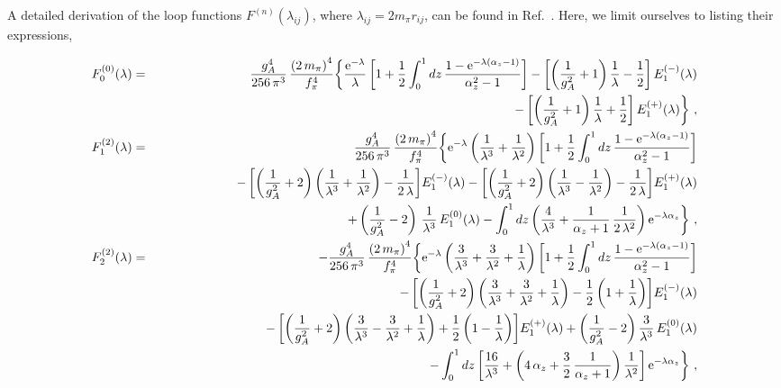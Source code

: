 \documentclass[aps,prc,floatfix,showpacs,twocolumn, preprintnumbers]{revtex4-2}
\begin{document}
A detailed derivation of the loop functions $F^{(n)}(\lambda_{ij})$, where $\lambda_{ij}=2m_{\pi}r_{ij}$, can be found in  Ref.~\cite{Schiavilla:2018udt}. Here, we limit ourselves to listing their expressions,
\begin{widetext}
\begin{eqnarray*}
F_0^{(0)}(\lambda) &=& \frac{g_A^4}{256\,\pi^3}\,
\frac{\left(2\, m_\pi\right)^4}{f_{\pi}^4}\bigg\{
  \frac{{\rm e}^{-\lambda}}{\lambda} \left[ 1+\frac{1}{2}\int_0^1dz\, \frac{1-{\rm e}^{-\lambda(\alpha_z-1)}}{\alpha_z^2-1} \right]
-\left[\left(\frac{1}{g_A^2} +1\right)\frac{1}{\lambda} -\frac{1}{2} \right]  E^{(-)}_1(\lambda) \nonumber\\
&& \hspace{7cm} -\left[ \left( \frac{1}{g_A^2}+1\right)\frac{1}{\lambda}+\frac{1}{2}\right]
 E^{(+)}_1(\lambda)  \bigg\}\ , \\
F_1^{(2)}(\lambda) &=& \frac{g_A^4}{256\,\pi^3}\,\frac{\left(2\, m_\pi\right)^4}{f_{\pi}^4} \bigg\{
  {\rm e}^{-\lambda} \left(\frac{1}{\lambda^3}+\frac{1}{\lambda^2}\right) \left[1+\frac{1}{2}\int_0^1dz\, \frac{1-{\rm e}^{-\lambda(\alpha_z-1)}}{\alpha_z^2-1} \right] \nonumber\\
  &&\hspace{-0.25cm}- \left[ \left( \frac{1}{g_A^2}+2\right)
 \left(\frac{1}{\lambda^3}+\frac{1}{\lambda^2}\right) 
-\frac{1}{2\,\lambda}\right] \! E_1^{(-)}(\lambda)
- \left[ \left( \frac{1}{g_A^2}+2\right) 
\left(\frac{1}{\lambda^3}-\frac{1}{\lambda^2}\right)-\frac{1}{2\,\lambda}\right] 
\! E_1^{(+)}(\lambda)\nonumber\\
&&\hspace{-0.25cm}+ \left(\frac{1}{g_A^2} -2\right)\,\frac{1}{\lambda^3}\, E_1^{(0)}(\lambda)
-\int_0^1 dz \left(\frac{4}{\lambda^3}+\frac{1}{\alpha_z+1}\, \frac{1}{2\, \lambda^2} \right)
 {\rm e}^{-\lambda\alpha_z}\bigg\}\ , \\
F_2^{(2)}(\lambda) &=&  -\frac{g_A^4}{256\,\pi^3}\,\frac{\left(2\, m_\pi\right)^4}{f_{\pi}^4} \bigg\{
  {\rm e}^{-\lambda} \left(\frac{3}{\lambda^3}+\frac{3}{\lambda^2}+\frac{1}{\lambda}\right) \left[1+\frac{1}{2}\int_0^1dz\, \frac{1-{\rm e}^{-\lambda(\alpha_z-1)}}{\alpha_z^2-1} \right] \nonumber\\
&&\hspace{3cm}- \left[ \left( \frac{1}{g_A^2}+2\right)
 \left(\frac{3}{\lambda^3}+\frac{3}{\lambda^2}+\frac{1}{\lambda}\right) 
-\frac{1}{2}\left(1+ \frac{1}{\lambda}\right)\right] \! E_1^{(-)}(\lambda) \nonumber\\
&&\hspace{3cm}-\left[ \left( \frac{1}{g_A^2}+2\right)
 \left(\frac{3}{\lambda^3}-\frac{3}{\lambda^2}+\frac{1}{\lambda}\right) 
+\frac{1}{2}\left(1- \frac{1}{\lambda}\right)\right]   \! E_1^{(+)}(\lambda)
+ \left(\frac{1}{g_A^2} -2\right)\frac{3}{\lambda^3} \, E_1^{(0)}(\lambda) \nonumber\\
&&\hspace{3cm}-\int_0^1 dz \left[\frac{16}{\lambda^3}
+\left( 4\,\alpha_z+\frac{3}{2}\, \frac{1}{\alpha_z+1}\right) 
\frac{1}{\lambda^2}\right]
{\rm e}^{-\lambda\alpha_z} \bigg\}\ ,
\end{eqnarray*}
\end{widetext}
\end{document}
